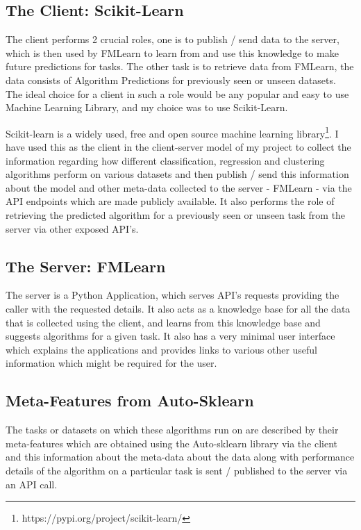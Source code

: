 \subsection{The Client: Scikit-Learn}
The client performs 2 crucial roles, one is to publish / send data to the server, which is then used by FMLearn to learn from and use this knowledge to make future predictions for tasks. The other task is to retrieve data from FMLearn, the data consists of Algorithm Predictions for previously seen or unseen datasets. The ideal choice for a client in such a role would be any popular and easy to use Machine Learning Library, and my choice was to use Scikit-Learn.

Scikit-learn \citep{scikit-learn} is a widely used, free and open source machine learning library\footnote{https://pypi.org/project/scikit-learn/}. I have used this as the client in the client-server model of my project to collect the information regarding how different classification, regression and clustering algorithms perform on various datasets and then publish / send this information about the model and other meta-data collected to the server - FMLearn - via the API endpoints which are made publicly available. It  also performs the role of retrieving the predicted algorithm for a previously seen or unseen task from the server via other exposed API's.

\subsection{The Server: FMLearn}
The server is a Python Application, which serves API's requests providing the caller with the requested details. It also acts as a knowledge base for all the data that is collected using the client, and learns from this knowledge base and suggests algorithms for a given task. It also has a very minimal user interface which explains the applications and provides links to various other useful information which might be required for the user.

\subsection{Meta-Features from Auto-Sklearn}
The tasks or datasets on which these algorithms run on are described by their meta-features which are obtained using the Auto-sklearn \citep{feurer:m} library via the client and this information about the meta-data about the data along with performance details of the algorithm on a particular task is sent / published to the server via an API call.

